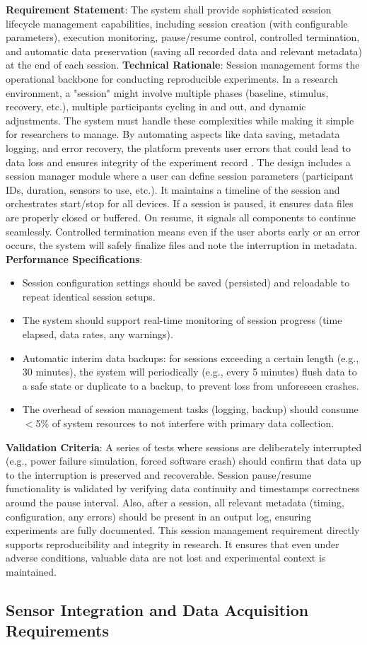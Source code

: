 \documentclass[11pt,a4paper]{report}
\begin{document}
\textbf{Requirement Statement}: The system shall provide sophisticated session lifecycle management capabilities, including session creation (with configurable parameters), execution monitoring, pause/resume control, controlled termination, and automatic data preservation (saving all recorded data and relevant metadata) at the end of each session. \textbf{Technical Rationale}: Session management forms the operational backbone for conducting reproducible experiments. In a research environment, a "session" might involve multiple phases (baseline, stimulus, recovery, etc.), multiple participants cycling in and out, and dynamic adjustments. The system must handle these complexities while making it simple for researchers to manage. By automating aspects like data saving, metadata logging, and error recovery, the platform prevents user errors that could lead to data loss and ensures integrity of the experiment record \cite{Wilson2014BestPractices}. The design includes a session manager module where a user can define session parameters (participant IDs, duration, sensors to use, etc.). It maintains a timeline of the session and orchestrates start/stop for all devices. If a session is paused, it ensures data files are properly closed or buffered. On resume, it signals all components to continue seamlessly. Controlled termination means even if the user aborts early or an error occurs, the system will safely finalize files and note the interruption in metadata. \textbf{Performance Specifications}:
\begin{itemize}
\item Session configuration settings should be saved (persisted) and reloadable to repeat identical session setups.
\item The system should support real-time monitoring of session progress (time elapsed, data rates, any warnings).
\item Automatic interim data backups: for sessions exceeding a certain length (e.g., 30 minutes), the system will periodically (e.g., every 5 minutes) flush data to a safe state or duplicate to a backup, to prevent loss from unforeseen crashes.
\item The overhead of session management tasks (logging, backup) should consume $<$5\% of system resources to not interfere with primary data collection.
\end{itemize} \textbf{Validation Criteria}: A series of tests where sessions are deliberately interrupted (e.g., power failure simulation, forced software crash) should confirm that data up to the interruption is preserved and recoverable. Session pause/resume functionality is validated by verifying data continuity and timestamps correctness around the pause interval. Also, after a session, all relevant metadata (timing, configuration, any errors) should be present in an output log, ensuring experiments are fully documented. This session management requirement directly supports reproducibility and integrity in research. It ensures that even under adverse conditions, valuable data are not lost and experimental context is maintained. \subsection{Sensor Integration and Data Acquisition Requirements}
\end{document}
